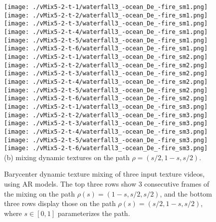 \begin{figure}[ht!]
{ \vspace{1mm}
    \texttt{[image: ./vMix5-2-t-1/waterfall3\_-ocean\_De\_-fire\_sm1.png]}
    \texttt{[image: ./vMix5-2-t-2/waterfall3\_-ocean\_De\_-fire\_sm1.png]}
    \texttt{[image: ./vMix5-2-t-3/waterfall3\_-ocean\_De\_-fire\_sm1.png]}
    \texttt{[image: ./vMix5-2-t-4/waterfall3\_-ocean\_De\_-fire\_sm1.png]}
    \texttt{[image: ./vMix5-2-t-5/waterfall3\_-ocean\_De\_-fire\_sm1.png]}
    \texttt{[image: ./vMix5-2-t-6/waterfall3\_-ocean\_De\_-fire\_sm1.png]}\\
\vspace{1mm}
    \texttt{[image: ./vMix5-2-t-1/waterfall3\_-ocean\_De\_-fire\_sm2.png]}
    \texttt{[image: ./vMix5-2-t-2/waterfall3\_-ocean\_De\_-fire\_sm2.png]}
    \texttt{[image: ./vMix5-2-t-3/waterfall3\_-ocean\_De\_-fire\_sm2.png]}
    \texttt{[image: ./vMix5-2-t-4/waterfall3\_-ocean\_De\_-fire\_sm2.png]}
    \texttt{[image: ./vMix5-2-t-5/waterfall3\_-ocean\_De\_-fire\_sm2.png]}
    \texttt{[image: ./vMix5-2-t-6/waterfall3\_-ocean\_De\_-fire\_sm2.png]}\\
\vspace{1mm}
    \texttt{[image: ./vMix5-2-t-1/waterfall3\_-ocean\_De\_-fire\_sm3.png]}
    \texttt{[image: ./vMix5-2-t-2/waterfall3\_-ocean\_De\_-fire\_sm3.png]}
    \texttt{[image: ./vMix5-2-t-3/waterfall3\_-ocean\_De\_-fire\_sm3.png]}
    \texttt{[image: ./vMix5-2-t-4/waterfall3\_-ocean\_De\_-fire\_sm3.png]}
    \texttt{[image: ./vMix5-2-t-5/waterfall3\_-ocean\_De\_-fire\_sm3.png]}
    \texttt{[image: ./vMix5-2-t-6/waterfall3\_-ocean\_De\_-fire\_sm3.png]}\\
(b) mixing dynamic textures on the path $\rho =(s/2, 1-s, s/2)$.\\
}
\caption{Barycenter dynamic texture mixing of three input texture videos, using AR models. The top three rows show 3 consecutive frames of the mixing on the path $\rho(s) = (1-s, s/2, s/2)$, and the bottom three rows display those on the path $\rho(s) = (s/2, 1-s, s/2)$, where $s \in [0, 1]$ parameterizes the path.
}
\label{fig:dynamic-barycenter-ar}
\end{figure} 